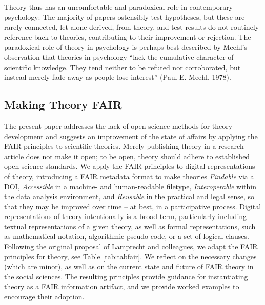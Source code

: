 \documentclass[
  man,floatsintext]{apa6}
\begin{document}
Theory thus has an uncomfortable and paradoxical role in contemporary psychology:
The majority of papers ostensibly test hypotheses,
but these are rarely connected, let alone derived, from theory,
and test results do not routinely reference back to theories, contributing to their improvement or rejection.
The paradoxical role of theory in psychology is perhaps best described by Meehl's observation that theories in psychology ``lack the cumulative character of scientific knowledge. They tend neither to be refuted nor corroborated, but instead merely fade away as people lose interest'' (Paul E. Meehl, 1978).

\subsection{Making Theory FAIR}\label{making-theory-fair}

The present paper addresses the lack of open science methods for theory development and suggests an improvement of the state of affairs by applying the FAIR principles to scientific theories.
Merely publishing theory in a research article does not make it open;
to be open, theory should adhere to established open science standards.
We apply the FAIR principles to digital representations of theory,
introducing a FAIR metadata format to make theories \emph{Findable} via a DOI,
\emph{Accessible} in a machine- and human-readable filetype,
\emph{Interoperable} within the data analysis environment,
and \emph{Reusable} in the practical and legal sense, so that they may be improved over time -- at best, in a participative process.
Digital representations of theory intentionally is a broad term, particularly including textual representations of a given theory, as well as formal representations, such as mathematical notation, algorithmic pseudo code, or a set of logical clauses.
Following the original proposal of Lamprecht and colleagues,
we adapt the FAIR principles for theory, see Table \ref{tab:tabfair}.
We reflect on the necessary changes (which are minor),
as well as on the current state and future of FAIR theory in the social sciences.
The resulting principles provide guidance for instantiating theory as a FAIR information artifact,
and we provide worked examples to encourage their adoption.
\end{document}
